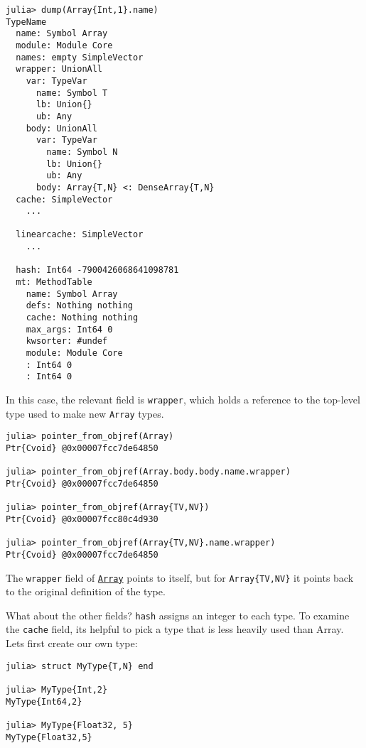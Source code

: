 \begin{verbatim}
julia> dump(Array{Int,1}.name)
TypeName
  name: Symbol Array
  module: Module Core
  names: empty SimpleVector
  wrapper: UnionAll
    var: TypeVar
      name: Symbol T
      lb: Union{}
      ub: Any
    body: UnionAll
      var: TypeVar
        name: Symbol N
        lb: Union{}
        ub: Any
      body: Array{T,N} <: DenseArray{T,N}
  cache: SimpleVector
    ...

  linearcache: SimpleVector
    ...

  hash: Int64 -7900426068641098781
  mt: MethodTable
    name: Symbol Array
    defs: Nothing nothing
    cache: Nothing nothing
    max_args: Int64 0
    kwsorter: #undef
    module: Module Core
    : Int64 0
    : Int64 0
\end{verbatim}



In this case, the relevant field is \texttt{wrapper}, which holds a reference to the top-level type used to make new \texttt{Array} types.




\begin{verbatim}
julia> pointer_from_objref(Array)
Ptr{Cvoid} @0x00007fcc7de64850

julia> pointer_from_objref(Array.body.body.name.wrapper)
Ptr{Cvoid} @0x00007fcc7de64850

julia> pointer_from_objref(Array{TV,NV})
Ptr{Cvoid} @0x00007fcc80c4d930

julia> pointer_from_objref(Array{TV,NV}.name.wrapper)
Ptr{Cvoid} @0x00007fcc7de64850
\end{verbatim}



The \texttt{wrapper} field of \hyperlink{15492651498431872487}{\texttt{Array}} points to itself, but for \texttt{Array\{TV,NV\}} it points back to the original definition of the type.



What about the other fields? \texttt{hash} assigns an integer to each type.  To examine the \texttt{cache} field, it{\textquotesingle}s helpful to pick a type that is less heavily used than Array. Let{\textquotesingle}s first create our own type:




\begin{verbatim}
julia> struct MyType{T,N} end

julia> MyType{Int,2}
MyType{Int64,2}

julia> MyType{Float32, 5}
MyType{Float32,5}
\end{verbatim}



